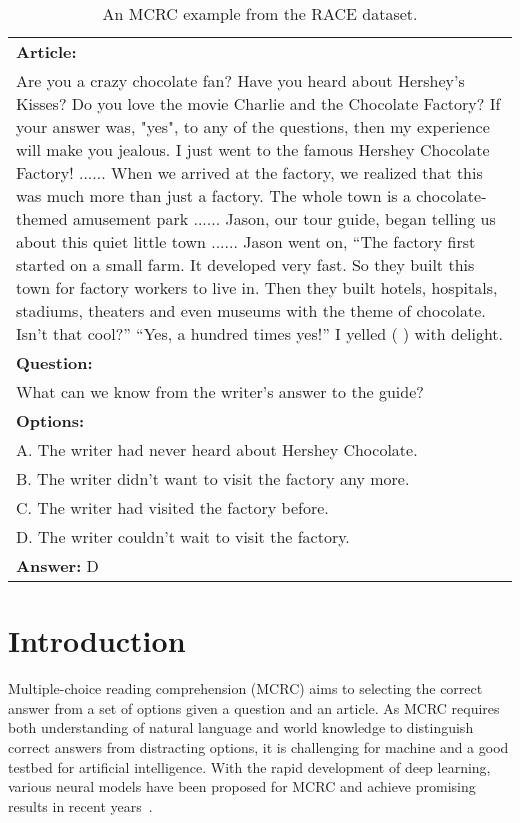 \documentclass[11pt,a4paper]{article}
\begin{document}
\begin{table}
    \small
    \centering
    \begin{tabular}{|p{}|}
    \hline
    {\bf Article:} \\
    Are you a crazy chocolate fan? Have you heard about Hershey's Kisses? Do you love the movie Charlie and the Chocolate Factory? If your answer was, "yes", to any of the questions, then my experience will make you jealous. I just went to the famous Hershey Chocolate Factory! ...... When we arrived at the factory, we realized that this was much more than just a factory. The whole town is a chocolate-themed amusement park ......
Jason, our tour guide, began telling us about this quiet little town ......
Jason went on, ``The factory first started on a small farm. It developed very fast. So they built this town for factory workers to live in. Then they built hotels, hospitals, stadiums, theaters and even museums with the theme of chocolate. Isn't that cool?''
    ``Yes, a hundred times yes!'' I yelled ( ) with delight.\\
    {\bf Question:}\\
    What can we know from the writer's answer to the guide?\\
    {\bf Options:}\\
    A. The writer had never heard about Hershey Chocolate. \\
    B. The writer didn't want to visit the factory any more. \\
    C. The writer had visited the factory before. \\
    D. The writer couldn't wait to visit the factory. \\
    {\bf Answer:} D\\
    \hline
    \end{tabular}
    \caption{An MCRC example from the RACE dataset.}
    \label{tab:example}
\end{table}

\section{Introduction}
\label{sec:intro}

Multiple-choice reading comprehension (MCRC) aims to selecting the correct answer from a set of options given a question and an article. As MCRC requires both understanding of natural language and world knowledge to distinguish correct answers from distracting options, it is challenging for machine and a good testbed for artificial intelligence. With the rapid development of deep learning, various neural models have been proposed for MCRC and achieve promising results in recent years~\cite{StanfordAR,yin2016HCQA,trischler2016,GAReader,MRU,ElimiNet,HAF,co-matching,DFN,Reading-Strategies-Model,shuailiang2019DCMN}.
\end{document}
